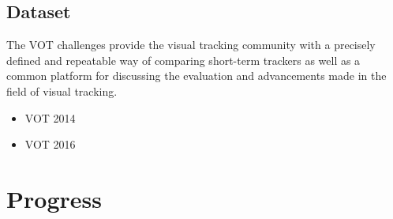 \documentclass[a4paper]{article}
\begin{document}
\subsection{Dataset}

The VOT challenges provide the visual tracking community with a precisely defined and repeatable way of comparing short-term trackers as well as a common platform for discussing the evaluation and advancements made in the field of visual tracking.
\cite{VOT2014} \cite{VOT2016}
\begin{itemize}
    \item VOT 2014
    \item VOT 2016
\end{itemize}





\section{Progress}
\end{document}
